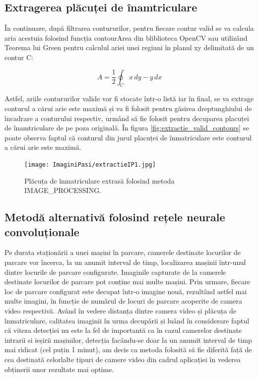 \documentclass[12pt]{article}
\begin{document}
\subsection{Extragerea pl\u{a}cuței de \^{i}namtriculare}

\^{I}n continuare, dup\u{a} filtrarea contururilor, pentru fiecare contur valid se va calcula aria acestuia folosind funcția contourArea din bliblioteca OpenCV sau utiliz\^{a}nd Teorema lui Green pentru calculul ariei unei regiuni \^{i}n planul xy delimitat\u{a} de un contur C:

\begin{equation}
A = \frac{1}{2} \oint_C x \, dy - y \, dx
\end{equation}

Astfel, ariile contururilor valide vor fi stocate \^{i}ntr-o list\u{a} iar \^{i}n final, se va extrage conturul a c\u{a}rui arie este maxim\u{a} și va fi folosit pentru g\u{a}sirea dreptunghiului de \^{i}ncadrare a conturului respectiv, urm\^{a}nd s\u{a} fie folosit pentru decuparea placuței de \^{i}namtriculare de pe poza original\u{a}. \^{I}n figura \ref{fig:extractie_valid_contours} se poate observa faptul c\u{a} conturul din jurul placuței de \^{i}nmatriculare este conturul a c\u{a}rui arie este maxim\u{a}.

\begin{figure}[H]
  \centering
  \texttt{[image: ImaginiPasi/extractieIP1.jpg]}
  \caption{Pl\u{a}cuța de \^{i}nmatriculare extras\u{a} folosind metoda IMAGE\_PROCESSING.}
  \label{fig:extractie_placuta_opencv}
\end{figure}

\subsection{Metod\u{a} alternativ\u{a} folosind rețele neurale convoluționale}

Pe durata stațion\u{a}rii a unei mașini \^{i}n parcare, camerele destinate locurilor de parcare vor \^{i}ncerca, la un anumit interval de timp, localizarea mașinii \^{i}ntr-unul dintre locurile de parcare configurate. Imaginile capturate de la camerele destinate locurilor de parcare pot conține mai multe mașini. Prin urmare, fiecare loc de parcare configurat este decupat \^{i}ntr-o imagine nou\u{a}, rezult\^{a}nd astfel mai multe imagini, \^{i}n funcție de num\u{a}rul de locuri de parcare acoperite de camera video respectiv\u{a}. Av\^{a}nd \^{i}n vedere distanța dintre camera video și pl\u{a}cuța de \^{i}nmatriculare, calitatea imaginii \^{i}n urma decup\u{a}rii și lu\^{a}nd \^{i}n considerare faptul c\u{a} viteza detecției nu este la fel de important\u{a} ca \^{i}n cazul camerelor destinate intrarii si ieșirii mașinilor, detecția fac\^{a}ndu-se doar la un anumit interval de timp mai ridicat (cel puțin 1 minut), am decis ca metoda folosit\u{a} s\u{a} fie diferit\u{a} faț\u{a} de cea destinat\u{a} celorlalte tipuri de camere video din cadrul aplicației \^{i}n vederea obținerii unor rezultate mai optime. 
\end{document}
